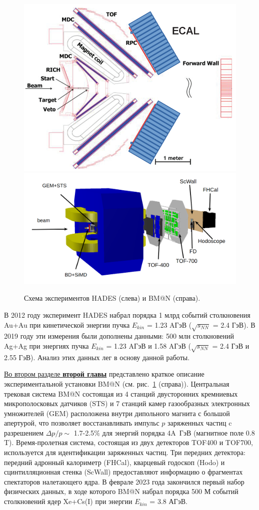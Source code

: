 %
\begin{figure}[h]
\begin{center}
\includegraphics[width=0.4\linewidth]{images/hades_layout.jpg}
\includegraphics[width=0.55\linewidth]{images/BM@N_layout.png}
\caption{Схема экспериментов HADES (слева) и BM@N (справа).}
\label{fig:hades_bmn_layouts}
\end{center}
\end{figure}


В 2012 году эксперимент HADES набрал порядка 1 млрд событий  столкновения Au+Au при кинетической
энергии пучка $E_{kin}$ = 1.23 AГэВ ($\sqrt{s_{NN}}$ = 2.4 ГэВ). В 2019 году
эти измерения были дополнены данными: 500 млн столкновений Ag+Ag
при энергиях пучка $E_{kin}$ = 1.23 AГэВ и 1.58 AГэВ ($\sqrt{s_{NN}}$ = 2.4 ГэВ и 2.55 ГэВ). Анализ этих данных лег в основу данной работы.

\underline{Во втором разделе \textbf{второй главы}} представлено краткое описание экспериментальной установки BM@N (см. рис.~\ref{fig:hades_bmn_layouts} (справа)).
Центральная трековая система BM@N состоящая из
4 станций двусторонних кремниевых микрополосковых датчиков (STS) и 7 станций
камер газообразных электронных умножителей (GEM) расположена внутри дипольного магнита с большой апертурой,
что позволяет восстанавливать импульс $p$ заряженных частиц c разрешением  $\Delta p/p \sim$ 1.7-2.5$\%$ для
энергий порядка 4A~ГэВ (магнитное поле 0.8 T). Время-пролетная система, состоящая из двух детекторов TOF400 и TOF700, используется для идентификации заряженных частиц.
Три передних детектора:
передний адронный калориметр (FHCal), кварцевый годоскоп (Hodo) и  сцинтилляционная стенка
(ScWall) предоставляют информацию о фрагментах спектаторов налетающего ядра.
В феврале 2023 года закончился первый  набор физических 
данных, в ходе которого BM@N набрал порядка 500 М событий столкновений ядер Xe+Cs(I) при энергии  $E_{kin}$ = 3.8 АГэВ.



